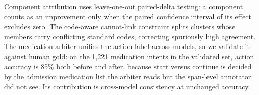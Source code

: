 Component attribution uses leave-one-out paired-delta testing: a component counts as an improvement only when the paired confidence interval of its effect excludes zero. The code-aware cannot-link constraint splits clusters whose members carry conflicting standard codes, correcting spuriously high agreement. The medication arbiter unifies the action label across models, so we validate it against human gold: on the 1,221 medication intents in the validated set, action accuracy is 85\% both before and after, because start versus continue is decided by the admission medication list the arbiter reads but the span-level annotator did not see. Its contribution is cross-model consistency at unchanged accuracy.
